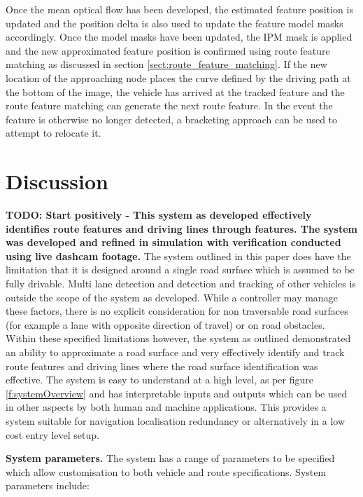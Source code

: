 \documentclass[]{aiaa-tc}%
\begin{document}
Once the mean optical flow has been developed, the estimated feature position is updated and the position delta is also used to update the feature model masks accordingly. Once the model masks have been updated, the IPM mask is applied and the new approximated feature position is confirmed using route feature matching as discussed in section \ref{sect:route_feature_matching}. If the new location of the approaching node places the curve defined by the driving path at the bottom of the image, the vehicle has arrived at the tracked feature and the route feature matching can generate the next route feature. In the event the feature is otherwise no longer detected, a bracketing approach can be used to attempt to relocate it.

\section{Discussion} \label{s:discussion}

\textbf{TODO: Start positively - This system as developed effectively identifies route features and driving lines through features. The system was developed and refined in simulation with verification conducted using live dashcam footage. }The system outlined in this paper does have the limitation that it is designed around a single road surface which is assumed to be fully drivable. Multi lane detection and detection and tracking of other vehicles is outside the scope of the system as developed. While a controller may manage these factors, there is no explicit consideration for non traversable road surfaces (for example a lane with opposite direction of travel) or on road obstacles. Within these specified limitations however, the system as outlined demonstrated an ability to approximate a road surface and very effectively identify and track route features and driving lines where the road surface identification was effective. The system is easy to understand at a high level, as per figure \ref{f:systemOverview} and has interpretable inputs and outputs which can be used in other aspects by both human and machine applications. This provides a system suitable for navigation localisation redundancy or alternatively in a low cost entry level setup.

\textbf{System parameters.} The system has a range of parameters to be specified which allow customisation to both vehicle and route specifications. System parameters include: 
\end{document}
